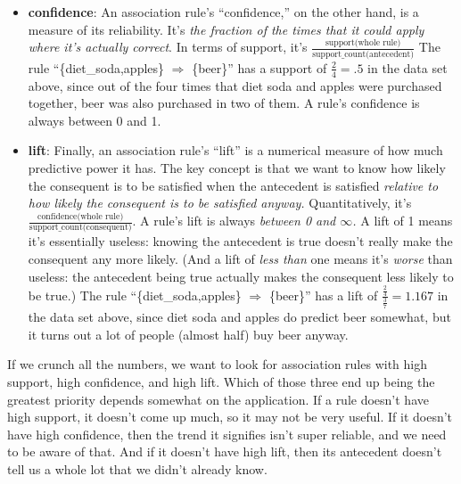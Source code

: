 \begin{itemize}
\begin{itemize}

    \item \textbf{confidence}: An association rule's ``confidence,'' on the
    other hand, is a measure of its reliability. It's \textit{the fraction of
    the times that it could apply where it's actually correct}. In terms of
    support, it's $\frac{\textrm{support(whole
    rule)}}{\textrm{support\_count(antecedent)}}$ The rule
    ``\{diet\_soda,apples\} $\Rightarrow$ \{beer\}'' has a support of
    $\frac{2}{4} = .5$ in the data set above, since out of the four times that
    diet soda and apples were purchased together, beer was also purchased in
    two of them. A rule's confidence is always between 0 and 1.


    \item \textbf{lift}: Finally, an association rule's ``lift'' is a
    numerical measure of how much predictive power it has. The key concept is
    that we want to know how likely the consequent is to be satisfied when the
    antecedent is satisfied \textit{relative to how likely the consequent is to
    be satisfied anyway.} Quantitatively, it's $\frac{\textrm{confidence(whole
    rule)}}{\textrm{support\_count(consequent)}}$. A rule's lift is always
    \textit{between 0 and $\infty$.} A lift of 1 means it's essentially useless:
    knowing the antecedent is true doesn't really make the consequent any more
    likely. (And a lift of \textit{less than} one means it's \textit{worse}
    than useless: the antecedent being true actually makes the consequent less
    likely to be true.) The rule ``\{diet\_soda,apples\} $\Rightarrow$
    \{beer\}'' has a lift of $\frac{\frac{2}{4}}{\frac{3}{7}} = 1.167$ in the
    data set above, since diet soda and apples do predict beer somewhat, but
    it turns out a lot of people (almost half) buy beer anyway.

    \end{itemize}

\end{itemize}

\vspace{-.1in}

If we crunch all the numbers, we want to look for association rules with high
support, high confidence, and high lift. Which of those three end up being
the greatest priority depends somewhat on the application. If a rule doesn't
have high support, it doesn't come up much, so it may not be very useful. If
it doesn't have high confidence, then the trend it signifies isn't super
reliable, and we need to be aware of that. And if it doesn't have high lift,
then its antecedent doesn't tell us a whole lot that we didn't already know.

